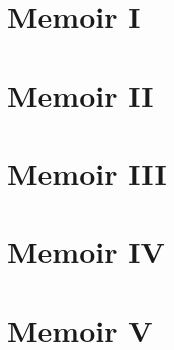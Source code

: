 \documentclass{memoir}
\begin{document}
\chapter{Memoir I}
\lipsum[10-15]

\chapter{Memoir II}
\lipsum[10]

\setcounter{page}{5} %
\chapter{Memoir III}
\lipsum[10]

\chapter{Memoir IV}
\lipsum[10]

\chapter{Memoir V}
\lipsum[10]
\end{document}
